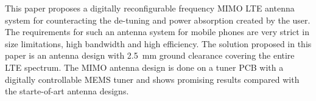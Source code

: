 This paper proposes a digitally reconfigurable frequency MIMO LTE antenna system for counteracting the de-tuning and power absorption created by the user. The requirements for such an antenna system for mobile phones are very strict in size limitations, high bandwidth and high efficiency. The solution proposed in this paper is an antenna design with \SI{2.5}{mm} ground clearance covering the entire LTE spectrum. 
The MIMO antenna design is done on a tuner PCB with a digitally controllable MEMS tuner and shows promising results compared with the starte-of-art antenna designs.

% 
% 
% 
% 
% 
% 
